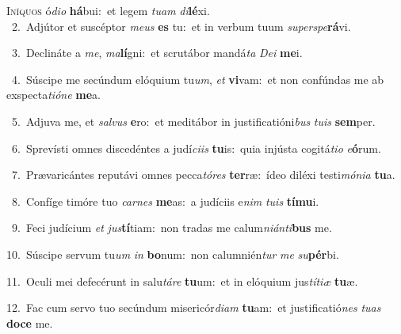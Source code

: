 \lettrine{\initial\textcolor{\initialcolor}{I}}{níquos} ó\-\textit{di}\-\textit{o} \textbf{há}\-bui:~\star et legem \textit{tu}\-\textit{am} \textit{di}\-\textbf{lé}xi.\\
{\numbfont\textcolor{\numbcolor}{~2.}}~Adjútor et suscéptor \textit{me}\-\textit{us} \textbf{es} tu:~\star et in verbum tuum \textit{su}\-\textit{per}\textit{spe}\textbf{rá}vi.\par
{\numbfont\textcolor{\numbcolor}{~3.}}~Declináte a \textit{me}\-, \textit{ma}\-\textbf{lí}gni:~\star et scrutábor mandá\textit{ta} \textit{De}\-\textit{i} \textbf{me}\-i.\par
{\numbfont\textcolor{\numbcolor}{~4.}}~Súscipe me secúndum elóquium tu\-\textit{um}\-, \textit{et} \textbf{vi}\-vam:~\star et non confúndas me ab exspecta\-\textit{ti}\-\textit{ó}\textit{ne} \textbf{me}\-a.\par
{\numbfont\textcolor{\numbcolor}{~5.}}~Adjuva me, et \textit{sal}\-\textit{vus} \textbf{e}\-ro:~\star et meditábor in justificatióni\textit{bus} \textit{tu}\-\textit{is} \textbf{sem}\-per.\par
{\numbfont\textcolor{\numbcolor}{~6.}}~Sprevísti omnes discedéntes a judí\-\textit{ci}\-\textit{is} \textbf{tu}\-is:~\star quia injústa cogitá\-\textit{ti}\-\textit{o} \textit{e}\-\textbf{ó}rum.\par
{\numbfont\textcolor{\numbcolor}{~7.}}~Prævaricántes reputávi omnes pecca\-\textit{tó}\-\textit{res} \textbf{ter}\-ræ:~\star ídeo diléxi testi\-\textit{mó}\-\textit{ni}\textit{a} \textbf{tu}\-a.\par
{\numbfont\textcolor{\numbcolor}{~8.}}~Confíge timóre tuo \textit{car}\-\textit{nes} \textbf{me}\-as:~\star a judíciis e\textit{nim} \textit{tu}\-\textit{is} \textbf{tí}\-\textbf{mu}i.\par
{\numbfont\textcolor{\numbcolor}{~9.}}~Feci judícium \textit{et} \textit{jus}\-\textbf{tí}tiam:~\star non tradas me calum\-\textit{ni}\-\textit{án}\textit{ti}\textbf{bus} me.\par
{\numbfont\textcolor{\numbcolor}{10.}}~Súscipe servum tu\textit{um} \textit{in} \textbf{bo}\-num:~\star non calumnién\textit{tur} \textit{me} \textit{su}\-\textbf{pér}bi.\par
{\numbfont\textcolor{\numbcolor}{11.}}~Oculi mei defecérunt in salu\-\textit{tá}\-\textit{re} \textbf{tu}\-um:~\star et in elóquium jus\-\textit{tí}\-\textit{ti}\textit{æ} \textbf{tu}\-æ.\par
{\numbfont\textcolor{\numbcolor}{12.}}~Fac cum servo tuo secúndum misericór\-\textit{di}\-\textit{am} \textbf{tu}\-am:~\star et justificatió\textit{nes} \textit{tu}\-\textit{as} \textbf{do}\-\textbf{ce} me.\par
